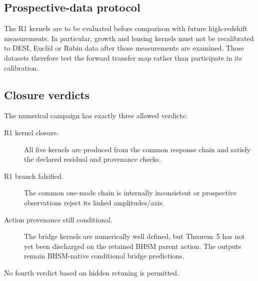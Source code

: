 \subsection{Prospective-data protocol}

The R1 kernels are to be evaluated before comparison with future
high-redshift measurements.  In particular, growth and lensing kernels must
not be recalibrated to DESI, Euclid or Rubin data after those measurements are
examined.  Those datasets therefore test the forward transfer map rather than
participate in its calibration.

\subsection{Closure verdicts}

The numerical campaign has exactly three allowed verdicts:

\begin{description}
\item[R1 kernel closure.] All five kernels are produced from the common
response chain and satisfy the declared residual and provenance checks.

\item[R1 branch falsified.] The common one-mode chain is internally
inconsistent or prospective observations reject its linked amplitudes/axis.

\item[Action provenance still conditional.] The bridge kernels are numerically
well defined, but Theorem~5 has not yet been discharged on the retained BHSM
parent action.  The outputs remain BHSM-native conditional bridge
predictions.
\end{description}

No fourth verdict based on hidden retuning is permitted.
